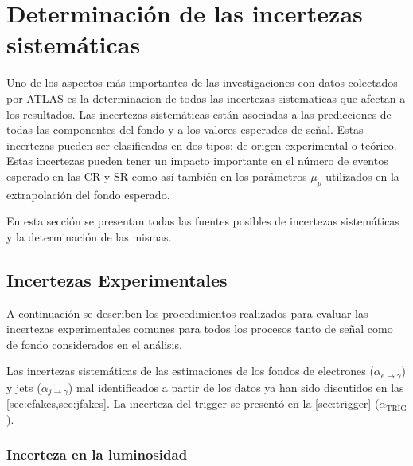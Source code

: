 \section{Determinación de las incertezas sistemáticas}
\label{cap:sistematicos}

Uno de los aspectos más importantes de las investigaciones con datos colectados por ATLAS
es la determinacion de todas las incertezas sistematicas que afectan a los resultados.
Las incertezas sistemáticas están asociadas a las predicciones de todas las
componentes del fondo y a los valores esperados de señal. Estas incertezas
pueden ser clasificadas en dos tipos: de origen experimental o teórico.
Estas incertezas pueden tener un impacto importante en el número de eventos esperado
en las CR y SR como así también en los parámetros $\mu_p$ utilizados en la
extrapolación del fondo esperado.

En esta sección se presentan todas las fuentes posibles de incertezas sistemáticas
y la determinación de las mismas.


\subsection{Incertezas Experimentales}\label{sec:expsyst}

A continuación se describen los procedimientos realizados para evaluar
las incertezas experimentales comunes para todos los procesos tanto de señal como
de fondo considerados en el análisis.

Las incertezas sistemáticas de las estimaciones de los fondos de electrones
($\alpha_{e\to\gamma}$) y jets ($\alpha_{j\to\gamma}$) mal identificados a partir
de los datos ya han sido discutidos en las \cref{sec:efakes,sec:jfakes}. La incerteza del
trigger se presentó en la \cref{sec:trigger} ($\alpha_\text{TRIG}$).


\subsubsection{Incerteza en la luminosidad}

